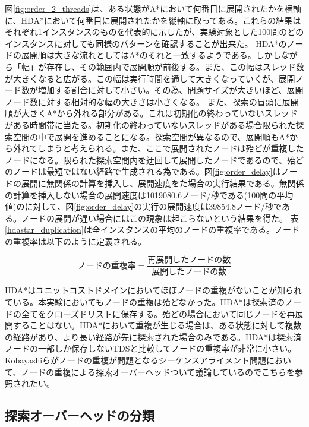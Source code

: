 \documentclass{jsarticle}
\begin{document}
図\ref{fig:order_2_threads}は、ある状態がA*において何番目に展開されたかを横軸に、HDA*において何番目に展開されたかを縦軸に取ってある。これらの結果はそれぞれ1インスタンスのものを代表的に示したが、実験対象とした100問のどのインスタンスに対しても同様のパターンを確認することが出来た。
HDA*のノードの展開順は大きな流れとしてはA*のそれと一致するようである。しかしながら「幅」が存在し、その範囲内で展開順が前後する。また、この幅はスレッド数が大きくなると広がる。この幅は実行時間を通して大きくなっていくが、展開ノード数が増加する割合に対して小さい。その為、問題サイズが大きいほど、展開ノード数に対する相対的な幅の大きさは小さくなる。
また、探索の冒頭に展開順が大きくA*から外れる部分がある。これは初期化の終わっていないスレッドがある時間帯に当たる。初期化の終わっていないスレッドがある場合限られた探索空間の中で展開を進めることになる。探索空間が異なるので、展開順もA*から外れてしまうと考えられる。また、ここで展開されたノードは殆どが重複したノードになる。限られた探索空間内を迂回して展開したノードであるので、殆どのノードは最短ではない経路で生成される為である。図\ref{fig:order_delay}はノードの展開に無関係の計算を挿入し、展開速度をた場合の実行結果である。無関係の計算を挿入しない場合の展開速度は1019080.6ノード/秒である(100問の平均値)のに対して、図\ref{fig:order_delay}の実行の展開速度は39854.8ノード/秒である。ノードの展開が遅い場合にはこの現象は起こらないという結果を得た。
表\ref{hdastar_duplication}は全インスタンスの平均のノードの重複率である。ノードの重複率は以下のように定義される。

\begin{equation}
	ノードの重複率 = \frac{再展開したノードの数}{展開したノードの数}
\end{equation}
\newline

HDA*はユニットコストドメインにおいてほぼノードの重複がないことが知られている\cite{Kishimoto2013}。本実験においてもノードの重複は殆どなかった。HDA*は探索済のノードの全てをクローズドリストに保存する。殆どの場合において同じノードを再展開することはない。HDA*において重複が生じる場合は、ある状態に対して複数の経路があり、より長い経路が先に探索された場合のみである。HDA*は探索済ノードの一部しか保存しないTDSと比較してノードの重複率が非常に小さい\cite{romein1999transposition}。Kobayashiらがノードの重複が問題となるシーケンスアライメント問題において、ノードの重複による探索オーバーヘッドついて議論しているのでこちらを参照されたい\cite{kobayashi2011evaluations}。


\subsection{探索オーバーヘッドの分類}
\end{document}
